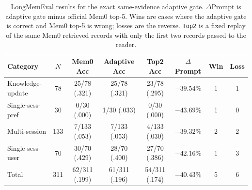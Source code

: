 \documentclass{article}
\begin{document}
\begin{table}[t]
\caption{LongMemEval results for the exact same-evidence adaptive gate. $\Delta$Prompt is adaptive gate minus official Mem0 top-5. Wins are cases where the adaptive gate is correct and Mem0 top-5 is wrong; losses are the reverse. \texttt{Top2} is a fixed replay of the same Mem0 retrieved records with only the first two records passed to the reader.}
\label{tab:aggregate_results}
\vskip 0.15in
\begin{center}
\begin{small}
\begin{sc}
\begin{tabular}{lccccccc}
\toprule
Category & $N$ & Mem0 Acc & Adaptive Acc & Top2 Acc & $\Delta$Prompt & Win & Loss \\
\midrule
Knowledge-update & 78 & 25/78 (.321) & 25/78 (.321) & 23/78 (.295) & $-39.54\%$ & 1 & 1 \\
\midrule
Single-sess-pref & 30 & 0/30 (.000) & 1/30 (.033) & 0/30 (.000) & $-43.69\%$ & 1 & 0 \\
\midrule
Multi-session & 133 & 7/133 (.053) & 7/133 (.053) & 4/133 (.030) & $-39.32\%$ & 2 & 2 \\
\midrule
Single-sess-user & 70 & 30/70 (.429) & 28/70 (.400) & 27/70 (.386) & $-42.16\%$ & 1 & 3 \\
\midrule
Total & 311 & 62/311 (.199) & 61/311 (.196) & 54/311 (.174) & $-40.43\%$ & 5 & 6 \\
\bottomrule
\end{tabular}
\end{sc}
\end{small}
\end{center}
\vskip -0.1in
\end{table}
\end{document}
